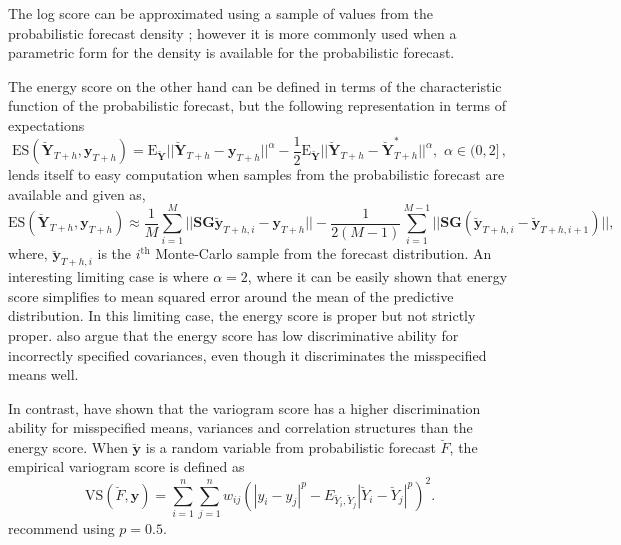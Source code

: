 \documentclass[12pt]{article}
\def\E{\text{E}}
\theoremstyle{definition}
\begin{document}
The log score can be approximated using a sample of values from the probabilistic forecast density \citep{Jordan2017}; however it is more commonly used when a parametric form for the density is available for the probabilistic forecast.

The energy score on the other hand can be defined in terms of the characteristic function of the probabilistic forecast, but the following representation in terms of expectations
\begin{equation}\label{eq:Energy_score}
\text{ES}(\breve{\bm{Y}}_{T+h},\bm{y}_{T+h}) =
\E_{\breve{\bm{Y}}}
||\breve{\bm{Y}}_{T+h}-\bm{y}_{T+h}||^\alpha -\frac{1}{2}\E_{\breve{\bm{Y}}}||\breve{\bm{Y}}_{T+h}-\breve{\bm{Y}}^*_{T+h}||^\alpha, \,\, \alpha \in (0,2]\,,
\end{equation}
lends itself to easy computation when samples from the probabilistic forecast are available and given as,
\begin{equation}\label{eq:ES_with_MCSamples}
\text{ES}(\breve{\bm{Y}}_{T+h},\bm{y}_{T+h}) \approx \frac{1}{M}\sum_{i=1}^{M}||\bm{SG}\breve{\bm{y}}_{T+h,i} -\bm{y}_{T+h}||-\frac{1}{2(M-1)}\sum_{i=1}^{M-1}||\bm{SG}(\breve{\bm{y}}_{T+h,i} -\breve{\bm{y}}_{T+h,i+1})||,
\end{equation}
where, $\breve{\bm{y}}_{T+h,i}$ is the $i^\text{th}$ Monte-Carlo sample from the forecast distribution. An interesting limiting case is where $\alpha=2$, where it can be easily shown that energy score simplifies to mean squared error around the mean of the predictive distribution. In this limiting case, the energy score is proper but not strictly proper. \citet{Pinson2013a} also argue that the energy score has low discriminative ability for incorrectly specified covariances, even though it discriminates the misspecified means well.

In contrast, \citet{SCHEUERER2015} have shown that the variogram score has a higher discrimination ability for misspecified means, variances and correlation structures than the energy score. When $\breve{\bm{y}}$ is a random variable from probabilistic forecast $\breve{F}$, the empirical variogram score is defined as
\begin{equation}
\text{VS}(\breve{F}, \bm{y}) = \displaystyle\sum_{i=1}^{n}\displaystyle\sum_{j=1}^{n}w_{ij}\left(|y_{i} - y_{j}|^p - E_{\breve{Y}_i,\breve{Y}_j} |\breve{Y}_{i}-\breve{Y}_{j}|^p\right)^2.
\end{equation}
\citet{SCHEUERER2015} recommend using $p=0.5$.
\end{document}
